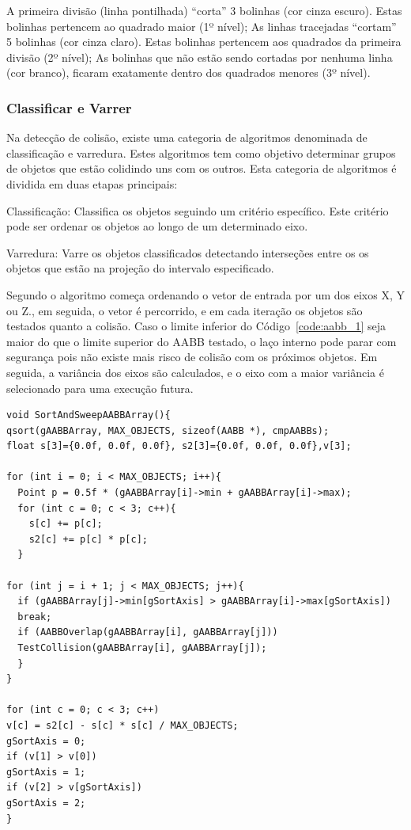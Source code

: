 \noindent\footnotesize A primeira divisão (linha pontilhada) “corta” 3 bolinhas (cor cinza escuro). Estas bolinhas pertencem ao quadrado maior (1º nível); As linhas tracejadas “cortam” 5 bolinhas (cor cinza claro). Estas bolinhas pertencem aos quadrados da primeira divisão (2º nível); As bolinhas que não estão sendo cortadas por nenhuma linha (cor branco), ficaram exatamente dentro dos quadrados menores (3º nível).

\subsubsection{Classificar e Varrer}

Na detecção de colisão, existe uma categoria de algoritmos denominada de
classificação e varredura. Estes algoritmos tem como objetivo determinar grupos
de objetos que estão colidindo uns com os outros. Esta categoria de algoritmos é dividida em duas etapas principais:

Classificação: Classifica os objetos seguindo um critério específico. Este
critério pode ser ordenar os objetos ao longo de um determinado eixo.

Varredura: Varre os objetos classificados detectando interseções entre os os
objetos que estão na projeção do intervalo especificado.

Segundo  o algoritmo começa ordenando o vetor de entrada por um dos eixos X, Y ou Z., em
seguida, o vetor é percorrido, e em cada iteração os objetos são testados
quanto a colisão. Caso o limite inferior do Código~\ref{code:aabb_1} seja maior do
que o limite superior do AABB testado, o laço interno pode parar com segurança
pois não existe mais risco de colisão com os próximos objetos. Em seguida, a
variância dos eixos são calculados, e o eixo com a maior variância é
selecionado para uma execução futura.

\begin{lstlisting}[frame=single,caption=Exemplo de ordenar e varrer\label{code:SortAndSweep}]
void SortAndSweepAABBArray(){
qsort(gAABBArray, MAX_OBJECTS, sizeof(AABB *), cmpAABBs);
float s[3]={0.0f, 0.0f, 0.0f}, s2[3]={0.0f, 0.0f, 0.0f},v[3];

for (int i = 0; i < MAX_OBJECTS; i++){
  Point p = 0.5f * (gAABBArray[i]->min + gAABBArray[i]->max);
  for (int c = 0; c < 3; c++){
    s[c] += p[c];
    s2[c] += p[c] * p[c];
  }

for (int j = i + 1; j < MAX_OBJECTS; j++){
  if (gAABBArray[j]->min[gSortAxis] > gAABBArray[i]->max[gSortAxis])
  break;
  if (AABBOverlap(gAABBArray[i], gAABBArray[j]))
  TestCollision(gAABBArray[i], gAABBArray[j]);
  }
}

for (int c = 0; c < 3; c++)
v[c] = s2[c] - s[c] * s[c] / MAX_OBJECTS;
gSortAxis = 0;
if (v[1] > v[0])
gSortAxis = 1;
if (v[2] > v[gSortAxis])
gSortAxis = 2;
}
\end{lstlisting}

